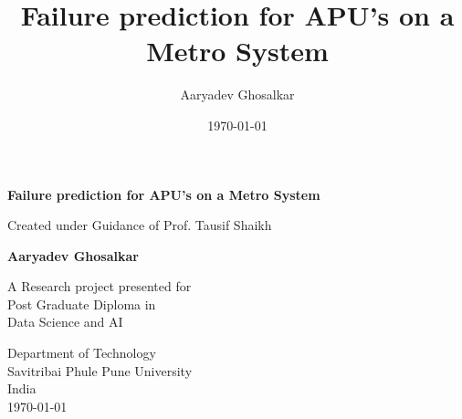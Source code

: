\documentclass{article}
\title{Failure prediction for APU's on a Metro System}
\author{Aaryadev Ghosalkar}
\date{\today}
\begin{document}
\begin{titlepage}
    \begin{center}
        \vspace*{1cm}
            
        \Huge
        \textbf{Failure prediction for APU's on a Metro System}
            
        \vspace{0.5cm}
        \LARGE
        Created under Guidance of Prof. Tausif Shaikh
            
        \vspace{1.5cm}
            
        \textbf{Aaryadev Ghosalkar}
            
        \vfill
            
        A Research project presented for \\
        Post Graduate Diploma in\\
        Data Science and AI
            
        \vspace{0.8cm}
            
        \Large
        Department of Technology\\
        Savitribai Phule Pune University\\
        India\\
        \today
            
    \end{center}
\end{titlepage}


\maketitle
\end{document}
